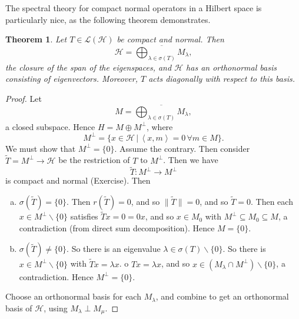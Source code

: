 \documentclass[10pt, oneside, reqno]{amsbook}
\theoremstyle{plain}%
\newtheorem{thm}{Theorem}[section]
\theoremstyle{definition}
\theoremstyle{remark}
\newcommand{\given}{ \, | \,}
\newcommand{\iprod}[1]{\left\langle #1 \right\rangle}
\begin{document}
The spectral theory for compact normal operators in a Hilbert space is particularly nice, as the following theorem demonstrates.
\begin{thm}
    Let $T \in \mathcal L(\mathcal H)$ be compact and normal.  Then \[
        \mathcal H = \overline{\bigoplus_{\lambda \in \sigma(T)} M_\lambda},
    \] the closure of the span of the eigenspaces, and $\mathcal H$ has an orthonormal basis consisting of eigenvectors.  Moreover, $T$ acts diagonally with respect to this basis.   
\end{thm}
\begin{proof}
    Let \[
        M = \overline{\bigoplus_{\lambda \in \sigma(T)} M_\lambda},
    \] a closed subspace.  Hence $H = M \oplus M^\perp$, where \[
    M^\perp = \{ x \in \mathcal H \given \iprod{x, m} = 0 \, \forall m \in M \}.
    \]   We must show that $M^\perp = \{ 0 \}$.  Assume the contrary.  Then consider $\tilde T = M^\perp \rightarrow \mathcal H$ be the restriction of $T$ to $M^\perp$.  Then we have \[
        \tilde T: M^\perp \rightarrow M^\perp
    \] is compact and normal (Exercise). Then  \begin{enumerate}[(a)]
        \item $\sigma(\tilde T) = \{ 0 \}$.  Then $r(\tilde T) = 0$, and so $\| \tilde T \| = 0$, and so $\tilde T = 0$.  Then each $x \in M^\perp \backslash \{ 0 \}$ satisfies $\tilde T x = 0 = 0x$, and so $x \in M_0$ with $M^\perp \subseteq M_0 \subseteq M$, a contradiction (from direct sum decomposition).  Hence $M = \{ 0 \}$.  
        \item $\sigma(\tilde T) \neq \{ 0 \}$.  So there is an eigenvalue $\lambda \in \sigma(T) \backslash \{ 0 \}$.  So there is $x \in M^\perp \backslash \{ 0 \}$ with $\tilde T x = \lambda x$.  o $Tx = \lambda x$, and so $x \in (M_\lambda \cap M^\perp) \backslash \{ 0 \}$, a contradiction.  Hence $M^\perp = \{ 0 \}$.    
    \end{enumerate}
    
    Choose an orthonormal basis for each $M_\lambda$, and combine to get an orthonormal basis of $\mathcal H$, using $M_\lambda \perp M_\mu$.  
\end{proof}  




\end{document}
